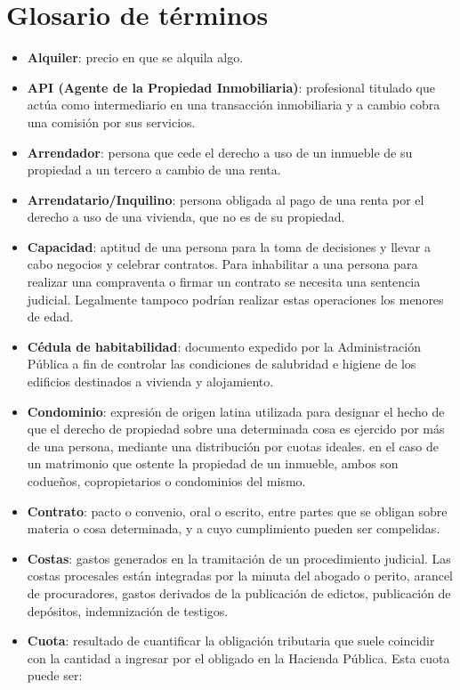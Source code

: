 \documentclass[10pt,a4paper]{article}
\begin{document}
{\section{Glosario de términos}
\begin{itemize}
\item \textbf{Alquiler}: precio en que se alquila algo.
\item \textbf{API (Agente de la Propiedad Inmobiliaria)}: profesional titulado que actúa como intermediario en una transacción inmobiliaria y a cambio cobra una comisión por sus servicios.
\item \textbf{Arrendador}: persona que cede el derecho a uso de un inmueble de su propiedad a un tercero a cambio de una renta.
\item \textbf{Arrendatario/Inquilino}: persona obligada al pago de una renta por el derecho a uso de una vivienda, que no es de su propiedad.
\item \textbf{Capacidad}: aptitud de una persona para la toma de decisiones y llevar a cabo negocios y celebrar contratos. Para inhabilitar a una persona para realizar una compraventa o firmar un contrato se necesita una sentencia judicial. Legalmente tampoco podrían realizar estas operaciones los menores de edad.
\item \textbf{Cédula de habitabilidad}: documento expedido por la Administración Pública a fin de controlar las condiciones de salubridad e higiene de los edificios destinados a vivienda y alojamiento.
\item \textbf{Condominio}: expresión de origen latina utilizada para designar el hecho de que el derecho de propiedad sobre una determinada cosa es ejercido por más de una persona, mediante una distribución por cuotas ideales. en el caso de un matrimonio que ostente la propiedad de un inmueble, ambos son codueños, copropietarios o condominios del mismo.
\item \textbf{Contrato}: pacto o convenio, oral o escrito, entre partes que se obligan sobre materia o cosa determinada, y a cuyo cumplimiento pueden ser compelidas.
\item \textbf{Costas}: gastos generados en la tramitación de un procedimiento judicial. Las costas procesales están integradas por la minuta del abogado o perito, arancel de procuradores, gastos derivados de la publicación de edictos, publicación de depósitos, indemnización de testigos.
\item \textbf{Cuota}: resultado de cuantificar la obligación tributaria que suele coincidir con la cantidad a ingresar por el obligado en la Hacienda Pública. Esta cuota puede ser:

\end{itemize}}
\end{document}
